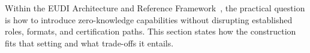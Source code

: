 


Within the EUDI Architecture and Reference Framework~\cite{EU:EUDI23}, the practical question is how to introduce zero-knowledge capabilities without disrupting established roles, formats, and certification paths. This section states how the construction fits that setting and what trade-offs it entails.

